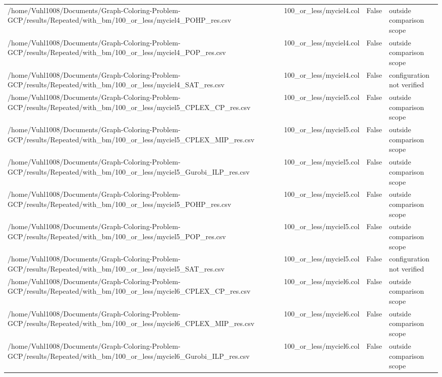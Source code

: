 \begin{table}[htbp]
\begin{tabular}{llll}
/home/Vuhl1008/Documents/Graph-Coloring-Problem-GCP/results/Repeated/with\_bm/100\_or\_less/myciel4\_POHP\_res.csv & 100\_or\_less/myciel4.col & False & outside comparison scope \\
/home/Vuhl1008/Documents/Graph-Coloring-Problem-GCP/results/Repeated/with\_bm/100\_or\_less/myciel4\_POP\_res.csv & 100\_or\_less/myciel4.col & False & outside comparison scope \\
/home/Vuhl1008/Documents/Graph-Coloring-Problem-GCP/results/Repeated/with\_bm/100\_or\_less/myciel4\_SAT\_res.csv & 100\_or\_less/myciel4.col & False & configuration not verified \\
/home/Vuhl1008/Documents/Graph-Coloring-Problem-GCP/results/Repeated/with\_bm/100\_or\_less/myciel5\_CPLEX\_CP\_res.csv & 100\_or\_less/myciel5.col & False & outside comparison scope \\
/home/Vuhl1008/Documents/Graph-Coloring-Problem-GCP/results/Repeated/with\_bm/100\_or\_less/myciel5\_CPLEX\_MIP\_res.csv & 100\_or\_less/myciel5.col & False & outside comparison scope \\
/home/Vuhl1008/Documents/Graph-Coloring-Problem-GCP/results/Repeated/with\_bm/100\_or\_less/myciel5\_Gurobi\_ILP\_res.csv & 100\_or\_less/myciel5.col & False & outside comparison scope \\
/home/Vuhl1008/Documents/Graph-Coloring-Problem-GCP/results/Repeated/with\_bm/100\_or\_less/myciel5\_POHP\_res.csv & 100\_or\_less/myciel5.col & False & outside comparison scope \\
/home/Vuhl1008/Documents/Graph-Coloring-Problem-GCP/results/Repeated/with\_bm/100\_or\_less/myciel5\_POP\_res.csv & 100\_or\_less/myciel5.col & False & outside comparison scope \\
/home/Vuhl1008/Documents/Graph-Coloring-Problem-GCP/results/Repeated/with\_bm/100\_or\_less/myciel5\_SAT\_res.csv & 100\_or\_less/myciel5.col & False & configuration not verified \\
/home/Vuhl1008/Documents/Graph-Coloring-Problem-GCP/results/Repeated/with\_bm/100\_or\_less/myciel6\_CPLEX\_CP\_res.csv & 100\_or\_less/myciel6.col & False & outside comparison scope \\
/home/Vuhl1008/Documents/Graph-Coloring-Problem-GCP/results/Repeated/with\_bm/100\_or\_less/myciel6\_CPLEX\_MIP\_res.csv & 100\_or\_less/myciel6.col & False & outside comparison scope \\
/home/Vuhl1008/Documents/Graph-Coloring-Problem-GCP/results/Repeated/with\_bm/100\_or\_less/myciel6\_Gurobi\_ILP\_res.csv & 100\_or\_less/myciel6.col & False & outside comparison scope \\

\end{tabular}
\end{table}
